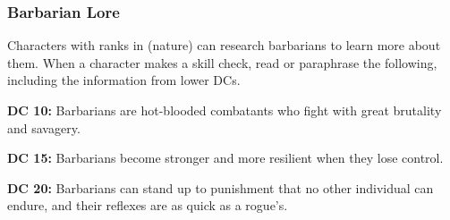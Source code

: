 \subsubsection{Barbarian Lore}
Characters with ranks in  (nature) can research barbarians to learn more about them. When a character makes a skill check, read or paraphrase the following, including the information from lower DCs.

\textbf{DC 10:} Barbarians are hot-blooded combatants who fight with great brutality and savagery.

\textbf{DC 15:} Barbarians become stronger and more resilient when they lose control.

\textbf{DC 20:} Barbarians can stand up to punishment that no other individual can endure, and their reflexes are as quick as a rogue's.